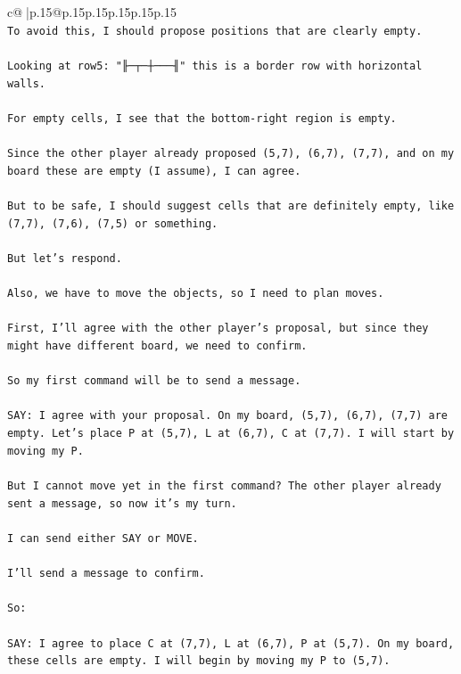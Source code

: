\documentclass{article}
\begin{document}
{\begin{supertabular}{c@{$\;$}|p{.15\linewidth}@{}p{.15\linewidth}p{.15\linewidth}p{.15\linewidth}p{.15\linewidth}p{.15\linewidth}}
{{{\\ 
\texttt{To avoid this, I should propose positions that are clearly empty.} \\
\\ 
\texttt{Looking at row5: "╟─┬─┼───╢" this is a border row with horizontal walls.} \\
\\ 
\texttt{For empty cells, I see that the bottom{-}right region is empty.} \\
\\ 
\texttt{Since the other player already proposed (5,7), (6,7), (7,7), and on my board these are empty (I assume), I can agree.} \\
\\ 
\texttt{But to be safe, I should suggest cells that are definitely empty, like (7,7), (7,6), (7,5) or something.} \\
\\ 
\texttt{But let's respond.} \\
\\ 
\texttt{Also, we have to move the objects, so I need to plan moves.} \\
\\ 
\texttt{First, I'll agree with the other player's proposal, but since they might have different board, we need to confirm.} \\
\\ 
\texttt{So my first command will be to send a message.} \\
\\ 
\texttt{SAY: I agree with your proposal. On my board, (5,7), (6,7), (7,7) are empty. Let's place P at (5,7), L at (6,7), C at (7,7). I will start by moving my P.} \\
\\ 
\texttt{But I cannot move yet in the first command? The other player already sent a message, so now it's my turn.} \\
\\ 
\texttt{I can send either SAY or MOVE.} \\
\\ 
\texttt{I'll send a message to confirm.} \\
\\ 
\texttt{So:} \\
\\ 
\texttt{SAY: I agree to place C at (7,7), L at (6,7), P at (5,7). On my board, these cells are empty. I will begin by moving my P to (5,7).} \\
            }
        }
    }
     \\ \\


\end{supertabular}}
\end{document}
